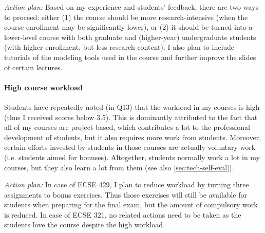 \emph{Action plan:} Based on my experience and students' feedback, there are two ways to proceed: either (1) the course should be more research-intensive (when the course enrollment may be significantly lower), or (2) it should be turned into a lower-level course with both graduate and (higher-year) undergraduate students (with higher enrollment, but less research content). 
I also plan to include tutorials of the modeling tools used in the course and further improve the slides of certain lectures. 

\paragraph{High course workload}
Students have repeatedly noted (in Q13) that the workload in my courses is high (thus I received scores below 3.5). 
This is dominantly attributed to the fact that all of my courses are project-based, which contributes a lot to the professional development of students, but it  also requires more work from students.  Moreover, certain efforts invested by students in those courses are actually voluntary work (i.e. students aimed for bonuses). Altogether, students normally work a lot in my courses, but they also learn a lot from them (see also \autoref{sec:tech-self-eval}). 

\emph{Action plan:} In case of ECSE 429, I plan to reduce workload by turning three assignments to bonus exercises. Thus those exercises will still be available for students when preparing for the final exam, but the amount of compulsory work is reduced. In case of ECSE 321, no related actions need to be taken as the students love the course despite the high workload.




